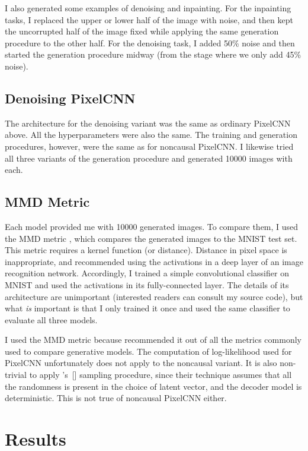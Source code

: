 \documentclass[11pt, a4paper, openany]{book}
\newcommand\cites[1]{\citeauthor{#1}'s\ [\citeyear{#1}]}
\begin{document}
I also generated some examples of denoising and inpainting. For the inpainting tasks, I replaced the upper or lower half of the image with noise, and then kept the uncorrupted half of the image fixed while applying the same generation procedure to the other half. For the denoising task, I added 50\% noise and then started the generation procedure midway (from the stage where we only add 45\% noise).

\section{Denoising PixelCNN}

The architecture for the denoising variant was the same as ordinary PixelCNN above. All the hyperparameters were also the same. The training and generation procedures, however, were the same as for noncausal PixelCNN. I likewise tried all three variants of the generation procedure and generated 10000 images with each.

\section{MMD Metric}

Each model provided me with 10000 generated images. To compare them, I used the MMD metric \citep{mmd,ganmetrics}, which compares the generated images to the MNIST test set. This metric requires a kernel function (or distance). Distance in pixel space is inappropriate, and \citet{ganmetrics} recommended using the activations in a deep layer of an image recognition network. Accordingly, I trained a simple convolutional classifier on MNIST and used the activations in its fully-connected layer. The details of its architecture are unimportant (interested readers can consult my source code), but what \emph{is} important is that I only trained it once and used the same classifier to evaluate all three models.

I used the MMD metric because \citet{ganmetrics} recommended it out of all the metrics commonly used to compare generative models. The computation of log-likelihood used for PixelCNN unfortunately does not apply to the noncausal variant. It is also non-trivial to apply \cites{likelihoodestimation} sampling procedure, since their technique assumes that all the randomness is present in the choice of latent vector, and the decoder model is deterministic. This is not true of noncausal PixelCNN either.


\chapter{Results}
\label{cha:result}
\end{document}
